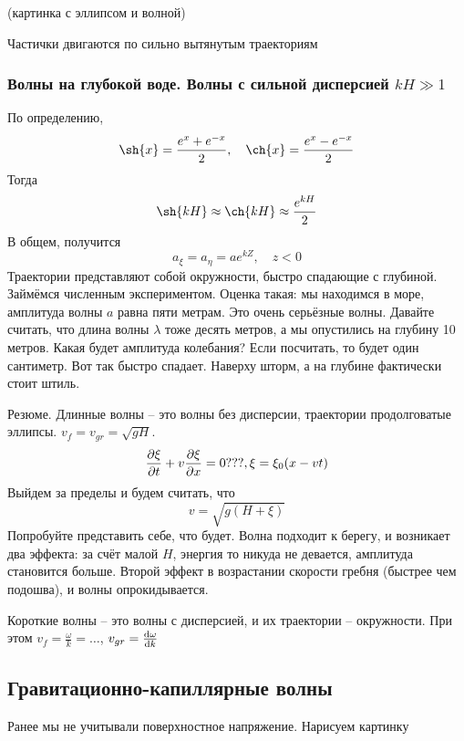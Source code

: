 (картинка с эллипсом и волной)

Частички двигаются по сильно вытянутым траекториям

\subsubsection{Волны на глубокой воде. Волны с сильной дисперсией $kH\gg 1$}
По определению, 
\begin{equation}
    \sh{x} = \frac{e^x+e^{-x}}{2}, \quad \ch{x} = \frac{e^x-e^{-x}}{2}
\end{equation}
Тогда 
\begin{equation}
    \sh{kH}\approx\ch{kH}\approx \frac{e^{kH}}{2} 
\end{equation}
В общем, получится
\begin{equation}
    a_\xi = a_\eta = ae^{kZ}, \quad z<0
\end{equation}
Траектории представляют собой окружности, быстро спадающие с глубиной. 
Займёмся численным экспериментом. 
Оценка такая: мы находимся в море, амплитуда волны $a$ равна пяти метрам.
Это очень серьёзные волны. 
Давайте считать, что длина волны $\lambda$ тоже десять метров, а мы опустились на глубину 10 метров.
Какая будет амплитуда колебания? Если посчитать, то будет один сантиметр. Вот так быстро спадает. Наверху шторм, а на глубине фактически стоит штиль.

Резюме.
Длинные волны -- это волны без дисперсии, траектории продолговатые эллипсы. $v_f = v_{gr} = \sqrt{gH}$. 
\begin{equation}
    \pdv{\xi}{t}+v\pdv{\xi}{x} = 0 ???, \xi = \xi_0(x-vt)
\end{equation}
Выйдем за пределы и будем считать, что
\begin{equation}
    v = \sqrt{g(H+\xi)}
\end{equation}
Попробуйте представить себе, что будет. Волна подходит к берегу, и возникает два эффекта: за счёт малой $H$, энергия то никуда не девается, амплитуда становится больше. Второй эффект в возрастании скорости гребня (быстрее чем подошва), и волны опрокидывается. 

Короткие волны -- это волны с дисперсией, и их траектории -- окружности. При этом $v_f = \frac{\omega}{k} = \ldots$, $v_{gr} = \dv{\omega}{k}$

\subsection{Гравитационно-капиллярные волны}
Ранее мы не учитывали поверхностное напряжение. Нарисуем картинку

